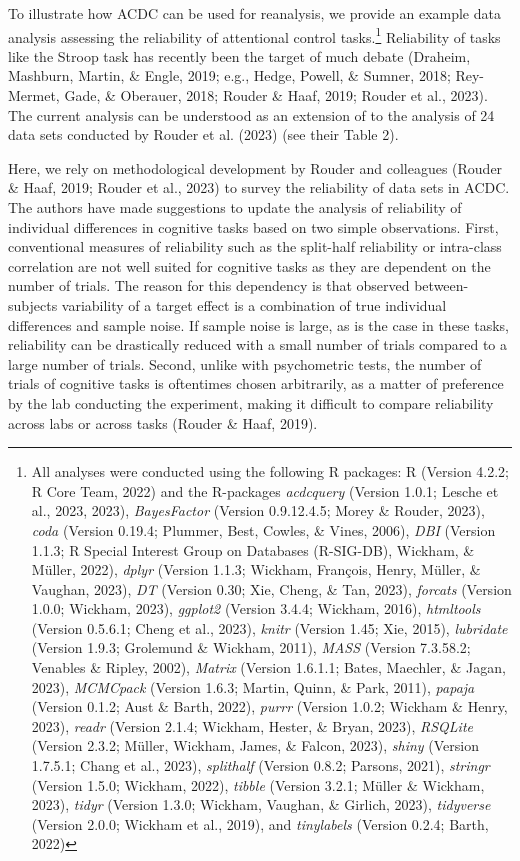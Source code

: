 \documentclass[
  man,floatsintext]{apa6}
\begin{document}
To illustrate how ACDC can be used for reanalysis, we provide an example data analysis assessing the reliability of attentional control tasks.\footnote{All analyses were conducted using the following R packages: R (Version 4.2.2; R Core Team, 2022) and the R-packages \emph{acdcquery} (Version 1.0.1; Lesche et al., 2023, 2023), \emph{BayesFactor} (Version 0.9.12.4.5; Morey \& Rouder, 2023), \emph{coda} (Version 0.19.4; Plummer, Best, Cowles, \& Vines, 2006), \emph{DBI} (Version 1.1.3; R Special Interest Group on Databases (R-SIG-DB), Wickham, \& Müller, 2022), \emph{dplyr} (Version 1.1.3; Wickham, François, Henry, Müller, \& Vaughan, 2023), \emph{DT} (Version 0.30; Xie, Cheng, \& Tan, 2023), \emph{forcats} (Version 1.0.0; Wickham, 2023), \emph{ggplot2} (Version 3.4.4; Wickham, 2016), \emph{htmltools} (Version 0.5.6.1; Cheng et al., 2023), \emph{knitr} (Version 1.45; Xie, 2015), \emph{lubridate} (Version 1.9.3; Grolemund \& Wickham, 2011), \emph{MASS} (Version 7.3.58.2; Venables \& Ripley, 2002), \emph{Matrix} (Version 1.6.1.1; Bates, Maechler, \& Jagan, 2023), \emph{MCMCpack} (Version 1.6.3; Martin, Quinn, \& Park, 2011), \emph{papaja} (Version 0.1.2; Aust \& Barth, 2022), \emph{purrr} (Version 1.0.2; Wickham \& Henry, 2023), \emph{readr} (Version 2.1.4; Wickham, Hester, \& Bryan, 2023), \emph{RSQLite} (Version 2.3.2; Müller, Wickham, James, \& Falcon, 2023), \emph{shiny} (Version 1.7.5.1; Chang et al., 2023), \emph{splithalf} (Version 0.8.2; Parsons, 2021), \emph{stringr} (Version 1.5.0; Wickham, 2022), \emph{tibble} (Version 3.2.1; Müller \& Wickham, 2023), \emph{tidyr} (Version 1.3.0; Wickham, Vaughan, \& Girlich, 2023), \emph{tidyverse} (Version 2.0.0; Wickham et al., 2019), and \emph{tinylabels} (Version 0.2.4; Barth, 2022)} Reliability of tasks like the Stroop task has recently been the target of much debate (Draheim, Mashburn, Martin, \& Engle, 2019; e.g., Hedge, Powell, \& Sumner, 2018; Rey-Mermet, Gade, \& Oberauer, 2018; Rouder \& Haaf, 2019; Rouder et al., 2023). The current analysis can be understood as an extension of to the analysis of 24 data sets conducted by Rouder et al. (2023) (see their Table 2).

Here, we rely on methodological development by Rouder and colleagues (Rouder \& Haaf, 2019; Rouder et al., 2023) to survey the reliability of data sets in ACDC. The authors have made suggestions to update the analysis of reliability of individual differences in cognitive tasks based on two simple observations. First, conventional measures of reliability such as the split-half reliability or intra-class correlation are not well suited for cognitive tasks as they are dependent on the number of trials. The reason for this dependency is that observed between-subjects variability of a target effect is a combination of true individual differences and sample noise. If sample noise is large, as is the case in these tasks, reliability can be drastically reduced with a small number of trials compared to a large number of trials. Second, unlike with psychometric tests, the number of trials of cognitive tasks is oftentimes chosen arbitrarily, as a matter of preference by the lab conducting the experiment, making it difficult to compare reliability across labs or across tasks (Rouder \& Haaf, 2019).
\end{document}
